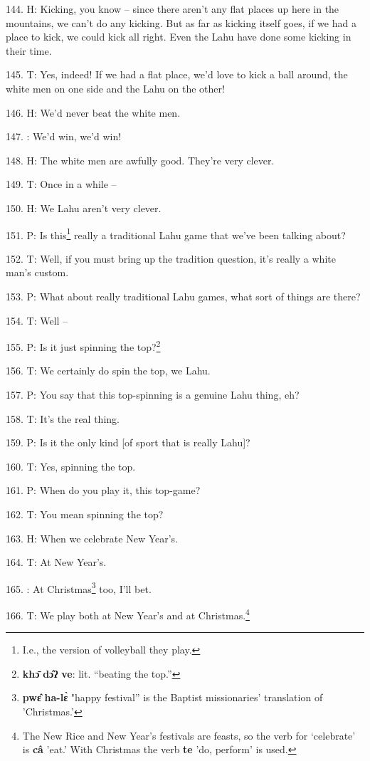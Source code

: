 144. H: Kicking, you know -- since there aren't any flat places up here in the mountains,
we can't do any kicking. But as far as kicking itself goes, if we had a place to
kick, we could kick all right. Even the Lahu have done some kicking in their time.

145. T: Yes, indeed! If we had a flat place, we'd love to kick a ball around, the
white men on one side and the Lahu on the other!

146. H: We'd never beat the white men.

147. : We'd win, we'd win!

148. H: The white men are awfully good. They're very clever.

149. T: Once in a while --

150. H: We Lahu aren't very clever.

151. P: Is this\footnote{I.e., the version of volleyball they play.} really a traditional Lahu game that we've been talking about?

152. T: Well, if you must bring up the tradition question, it's really a white man's
custom.

153. P: What about really traditional Lahu games, what sort of things are there?

154. T: Well --

155. P: Is it just spinning the top?\footnote{\textbf{khɔ̄} \textbf{dɔ̂ʔ} \textbf{ve}: lit. ``beating the top.''}

156. T: We certainly do spin the top, we Lahu.

157. P: You say that this top-spinning is a genuine Lahu thing, eh?

158. T: It's the real thing.

159. P: Is it the only kind [of sport that is really Lahu]?

160. T: Yes, spinning the top.

161. P: When do you play it, this top-game?

162. T: You mean spinning the top?

163. H: When we celebrate New Year's.

164. T: At New Year's.

165. : At Christmas\footnote{\textbf{pwɛ̂} \textbf{ha-lɛ̀} "happy festival'' is the Baptist missionaries' translation of 'Christmas.'} too, I'll bet.

166. T: We play both at New Year's and at Christmas.\footnote{The New Rice and New Year's festivals are feasts, so the verb for `celebrate' is \textbf{câ} 'eat.' With Christmas the verb \textbf{te} 'do, perform' is used.}


